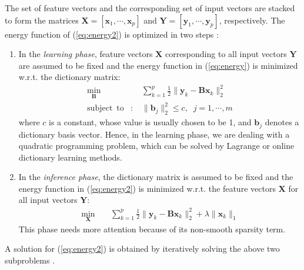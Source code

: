 \documentclass[journal]{IEEEtran}
\def\b{{\mathbf b}}
\def\x{{\mathbf x}}
\def\y{{\mathbf y}}
\def\B{{\mathbf B}}
\def\X{{\mathbf X}}
\def\Y{{\mathbf Y}}
\begin{document}
The set of feature vectors and the corresponding set of input vectors are stacked to form the matrices $\X=[\x_1, \cdots, \x_p]$ and $\Y=[\y_1, \cdots, \y_p]$, respectively. The energy function of (\ref{eq:energy2}) is optimized in two steps \cite{Mairal2012}:
\begin{enumerate}
\item In the \textit{learning phase}, feature vectors $\X$ corresponding to all input vectors $\Y$ are assumed to be fixed and the energy function in (\ref{eq:energy}) is minimized w.r.t. the dictionary matrix: 
    \begin{eqnarray} \label{eq:learn_phase}
    {\underset {\B}{\min}} & & \;
    \sum_{k=1}^p \frac{1}{2} \| \y_k-\B \x_k \|^2_2
    \\
    \textrm{subject} \; \ \textrm{to} &:& \; \| \b_j\|^2_2 \le c, \;\; j=1, \cdots, m \nonumber
    \end{eqnarray}
where $c$ is a constant, whose value is usually chosen to be 1, and $\b_j$ denotes a dictionary basis vector. Hence, in the learning phase, we are dealing with a quadratic programming problem, which can be solved by Lagrange \cite{Lee2006} or online dictionary learning \cite{Mairal2009} methods.
\item In the \textit{inference phase}, the dictionary matrix is assumed to be fixed and the energy function in (\ref{eq:energy2}) is minimized w.r.t. the feature vectors $\X$ for all input vectors $\Y$:
    \begin{eqnarray} \label{eq:inference_phase}
    {\underset {\X}{\min}} & & \;
    \sum_{k=1}^p \frac{1}{2} \| \y_k-\B \x_k \|^2_2 + \lambda \| \x_k \|_1
    \end{eqnarray}
    This phase needs more attention because of its non-smooth sparsity term.
\end{enumerate}
A solution for (\ref{eq:energy2}) is obtained by iteratively solving the above two subproblems \cite{Komodakis2015}.
\end{document}
